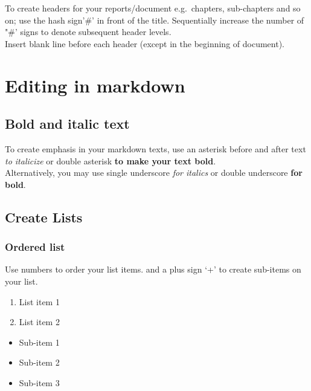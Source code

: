 \documentclass[
]{book}
\providecommand{\tightlist}{%
  \setlength{\itemsep}{0pt}\setlength{\parskip}{0pt}}
\begin{document}
To create headers for your reports/document e.g.~chapters, sub-chapters and so on; use the hash sign'\#' in front of the title. Sequentially increase the number of "\#' signs to denote subsequent header levels.\\
Insert blank line before each header (except in the beginning of document).

\hypertarget{editing-in-markdown}{%
\section{Editing in markdown}\label{editing-in-markdown}}

\hypertarget{bold-and-italic-text}{%
\subsection{Bold and italic text}\label{bold-and-italic-text}}

To create emphasis in your markdown texts, use an asterisk before and after text \emph{to italicize} or double asterisk \textbf{to make your text bold}.\\
Alternatively, you may use single underscore \emph{for italics} or double underscore \textbf{for bold}.

\hypertarget{create-lists}{%
\subsection{Create Lists}\label{create-lists}}

\hypertarget{ordered-list}{%
\subsubsection{Ordered list}\label{ordered-list}}

Use numbers to order your list items.
and a plus sign `+' to create sub-items on your list.

\begin{enumerate}
\def\labelenumi{\arabic{enumi}.}
\tightlist
\item
  List item 1\\
\item
  List item 2\\
\end{enumerate}

\begin{itemize}
\tightlist
\item
  Sub-item 1\\
\item
  Sub-item 2\\
\item
  Sub-item 3\\
\end{itemize}
\end{document}
